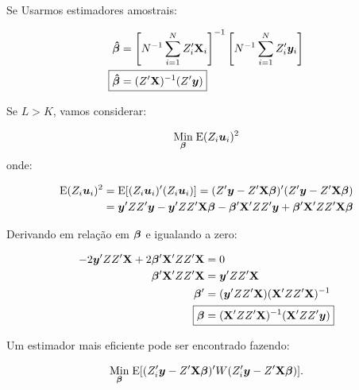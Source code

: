 \documentclass[11pt, oneside, a4paper, article]{article}
\numberwithin{equation}{section}
\begin{document}
\begin{description}
	Se Usarmos estimadores amostrais:

	\vspace{-1 em}
	\begin{align*}
		\mbs{\hat{\beta}} &=
		\left[ N^{-1} \sum_{i=1}^{N} Z_{i}^{\prime} \Xmat_{i} \right]^{-1}
		\left[ N^{-1} \sum_{i=1}^{N} Z_{i}^{\prime} \yvec_{i} \right]
		\\
		\Aboxed{
			\mbs{\hat{\beta}} &=
		( Z^{\prime} \Xmat )^{-1} ( Z^{\prime} \yvec ) }
	\end{align*}

	\vspace{1 em}
	Se $L > K$, vamos considerar:

	\vspace{-1 em}
	\begin{align*}
		\underset{\boldsymbol{\beta}}{\text{Min}} \;
		\text{E}( Z_{i}\boldsymbol{u}_{i} )^2
	\end{align*}
	\noindent onde:

	\vspace{-1 em}
	\begin{align*}
		\text{E}( Z_{i}\boldsymbol{u}_{i} )^2 
		&=
		\text{E}[ ( Z_{i}\boldsymbol{u}_{i} )' ( Z_{i}\boldsymbol{u}_{i} ) ]
		=
		( Z' \boldsymbol{y} - Z' \mathbf{X} \boldsymbol{\beta} )' ( Z' \boldsymbol{y} - Z' \mathbf{X} \boldsymbol{\beta} )
		\\
		&=
		\boldsymbol{y}' ZZ' \boldsymbol{y}
		-
		\boldsymbol{y}' ZZ' \mathbf{X} \boldsymbol{\beta}
		-
		\boldsymbol{\beta}' \mathbf{X}' ZZ' \boldsymbol{y}
		+
		\boldsymbol{\beta}' \mathbf{X}' ZZ' \mathbf{X} \boldsymbol{\beta}
	\end{align*}

	Derivando em relação em $\boldsymbol{\beta}$ e igualando a zero:

	\vspace{-1 em}
	\begin{align*}
		-2 \yvec' ZZ' \Xmat + 2 \betavec'\Xmat' ZZ' \Xmat &= 0
		\\
		\betavec'\Xmat' ZZ' \Xmat &= \yvec' ZZ' \Xmat 
		\\
		\betavec' &= ( \yvec' ZZ' \Xmat ) ( \Xmat' ZZ' \Xmat )^{-1}
		\\
		\Aboxed{
		\betavec &= ( \Xmat' ZZ' \Xmat )^{-1} ( \Xmat' ZZ' \yvec ) }
	\end{align*}

	Um estimador mais eficiente pode ser encontrado fazendo:

	\vspace{-1 em}
	\begin{align*}
		\underset{\boldsymbol{\beta}}{\text{Min}} \;
		\text{E}[ ( Z_{i}' \boldsymbol{y} - Z' \mathbf{X} \boldsymbol{\beta} )' W ( Z_{i}' \boldsymbol{y} - Z' \mathbf{X} \boldsymbol{\beta} ) ].
	\end{align*}


\end{description}
\end{document}
